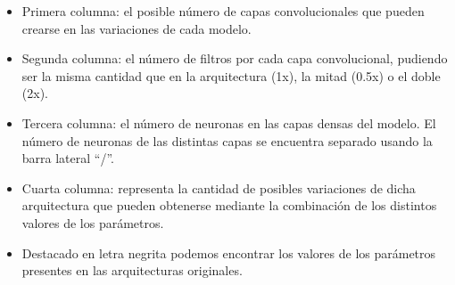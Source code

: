 \begin{itemize}
    \item Primera columna: el posible número de capas convolucionales que pueden crearse en las variaciones de cada modelo.
    \item Segunda columna: el número de filtros por cada capa convolucional, pudiendo ser la misma cantidad que en la arquitectura (1x), la mitad (0.5x) o el doble (2x).
    \item Tercera columna: el número de neuronas en las capas densas del modelo. El número de neuronas de las distintas capas se encuentra separado usando la barra lateral ``/''.
    \item Cuarta columna: representa la cantidad de posibles variaciones de dicha arquitectura que pueden obtenerse mediante la combinación de los distintos valores de los parámetros.
    \item Destacado en letra negrita podemos encontrar los valores de los parámetros presentes en las arquitecturas originales.
\end{itemize}

